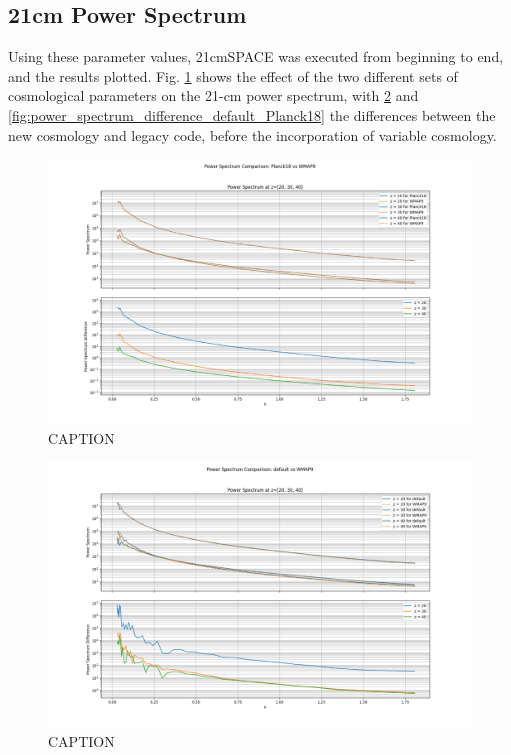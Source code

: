 \documentclass[floats,floatfix,showpacs,amssymb,prd,superscriptaddress,nofootinbib]{revtex4-2} %
\begin{document}
\subsection{21cm Power Spectrum}
Using these parameter values, 21cmSPACE was executed from beginning to end, and the results plotted. Fig. \ref{fig:power_spectrum_difference_Planck18_WMAP9} shows the effect of the two different sets of cosmological parameters on the 21-cm power spectrum, with \ref{fig:power_spectrum_difference_default_WMAP9} and \ref{fig:power_spectrum_difference_default_Planck18} the differences between the new cosmology and legacy code, before the incorporation of variable cosmology. 

\newpage
\begin{figure}[H]
    \centering
    \includegraphics[width=0.9\columnwidth]{images/simulation_results/power_spectrum_difference_Planck18_WMAP9.png}
    \caption{CAPTION}
    \label{fig:power_spectrum_difference_Planck18_WMAP9}
\end{figure}

\begin{figure}[H]
    \centering
    \includegraphics[width=0.9\columnwidth]{images/simulation_results/power_spectrum_difference_default_WMAP9.png}
    \caption{CAPTION}
    \label{fig:power_spectrum_difference_default_WMAP9}
\end{figure}
\end{document}
